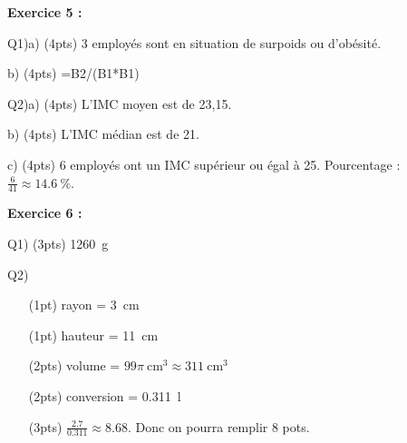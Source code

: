 \documentclass[12pt]{article}
\begin{document}
\textbf{Exercice 5 : }

Q1)a) (4pts) {\color{red} 3 employés sont en situation de surpoids ou d'obésité.}

b) (4pts) {\color{red} =B2/(B1*B1)}

Q2)a) (4pts) {\color{red} L'IMC moyen est de 23{,}15.}

b) (4pts) {\color{red} L'IMC médian est de 21.}

c) (4pts) {\color{red} 6 employés ont un IMC supérieur ou égal à 25. Pourcentage : $\frac{6}{41} \approx \qty{14.6}{\%}$.}

\textbf{Exercice 6 : }

Q1) (3pts) {\color{red} \qty{1260}{\gram}}

Q2) {\color{red}
    \begin{itemize}
        \item[(1pt)] rayon = \qty{3}{\cm}
        \item[(1pt)] hauteur = \qty{11}{\cm}
        \item[(2pts)] volume = $99\pi~\unit{\cm\cubed} \approx \qty{311}{\cm\cubed}$
        \item[(2pts)] conversion = \qty{0.311}{\litre}
        \item[(3pts)] $\frac{2.7}{0.311} \approx \num{8.68}$. Donc on pourra remplir 8 pots.
    \end{itemize}
}
\end{document}
